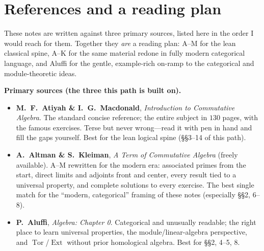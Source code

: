 \documentclass[11pt]{article}
\DeclareMathOperator{\Tor}{Tor}
\DeclareMathOperator{\Ext}{Ext}
\begin{document}
\section*{References and a reading plan}

\noindent
These notes are written against three primary sources, listed here in the order I would reach
for them. Together they \emph{are} a reading plan: A--M for the lean classical spine, A--K for
the same material redone in fully modern categorical language, and Aluffi for the gentle,
example-rich on-ramp to the categorical and module-theoretic ideas.
\sloppy

\medskip
\noindent\textbf{Primary sources (the three this path is built on).}
\begin{itemize}\setlength{\itemsep}{3pt}
\item \textbf{M.\ F.\ Atiyah \& I.\ G.\ Macdonald}, \emph{Introduction to Commutative
Algebra}. The standard concise reference; the entire subject in $130$ pages, with the famous
exercises. Terse but never wrong---read it with pen in hand and fill the gaps yourself. Best
for the lean logical spine (\S\S3--14 of this path).
\item \textbf{A.\ Altman \& S.\ Kleiman}, \emph{A Term of Commutative Algebra} (freely
available). A--M rewritten for the modern era: associated primes from the start, direct limits
and adjoints front and center, every result tied to a universal property, and complete
solutions to every exercise. The best single match for the ``modern, categorical'' framing of
these notes (especially \S\S2, 6--8).
\item \textbf{P.\ Aluffi}, \emph{Algebra: Chapter 0}. Categorical and unusually readable; the
right place to learn universal properties, the module/linear-algebra perspective, and
$\Tor$/$\Ext$ without prior homological algebra. Best for \S\S2, 4--5, 8.
\end{itemize}
\end{document}
